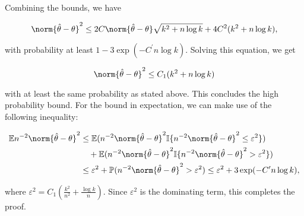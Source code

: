 \documentclass[11pt]{article}
\begin{document}
Combining the bounds, we have

\[ \norm{\htheta-\theta}^2 \leq 2C\norm{\htheta - \theta}\sqrt{k^2 +n \log k} + 4C^2(k^2 +n\log k),  \]

with probability at least $1-3\exp(-C^\prime n\log k)$. Solving this equation, we get

\[ \norm{\htheta-\theta}^2 \leq C_1 (k^2 + n\log k ) \]

with at least the same probability as stated above. This concludes the high probability bound. For the bound in expectation, we can make use of the following inequality:

\begin{align*}
    \mathbb{E}n^{-2}\norm{\htheta-\theta}^2 & \leq \mathbb{E}(n^{-2}\norm{\htheta-\theta}^2 \mathbb{I}\set{n^{-2}\norm{\htheta-\theta}^2 \leq \varepsilon^2} ) \\
    & \quad + \mathbb{E}(n^{-2}\norm{\htheta-\theta}^2 \mathbb{I}\set{n^{-2}\norm{\htheta-\theta}^2 > \varepsilon^2} ) \\
    & \leq \varepsilon^2 + \mathbb{P}(n^{-2}\norm{\htheta-\theta}^2 > \varepsilon^2) \leq \varepsilon^2 + 3\exp(-C^\prime n\log k),
\end{align*}

where $\varepsilon^2 = C_1(\frac{k^2}{n^2}+ \frac{\log k}{n})$. Since $\varepsilon^2$ is the dominating term, this completes the proof.
\end{document}
